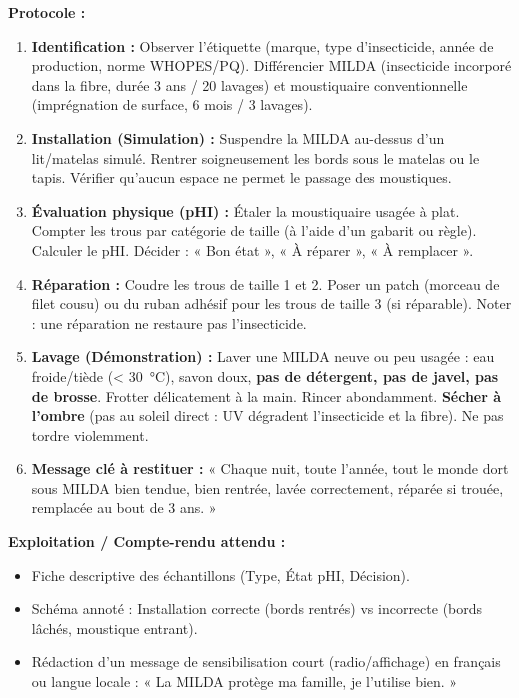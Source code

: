 \documentclass[11pt]{article}
\begin{document}
\begin{experience}
\textbf{Protocole :}
\begin{enumerate}
    \item \textbf{Identification :} Observer l'étiquette (marque, type d'insecticide, année de production, norme WHOPES/PQ). Différencier MILDA (insecticide incorporé dans la fibre, durée 3 ans / 20 lavages) et moustiquaire conventionnelle (imprégnation de surface, 6 mois / 3 lavages).
    \item \textbf{Installation (Simulation) :} Suspendre la MILDA au-dessus d'un lit/matelas simulé. Rentrer soigneusement les bords sous le matelas ou le tapis. Vérifier qu'aucun espace ne permet le passage des moustiques.
    \item \textbf{Évaluation physique (pHI) :} Étaler la moustiquaire usagée à plat. Compter les trous par catégorie de taille (à l'aide d'un gabarit ou règle). Calculer le pHI. Décider : « Bon état », « À réparer », « À remplacer ».
    \item \textbf{Réparation :} Coudre les trous de taille 1 et 2. Poser un patch (morceau de filet cousu) ou du ruban adhésif pour les trous de taille 3 (si réparable). Noter : une réparation ne restaure pas l'insecticide.
    \item \textbf{Lavage (Démonstration) :} Laver une MILDA neuve ou peu usagée : eau froide/tiède (< \SI{30}{\celsius}), savon doux, \textbf{pas de détergent, pas de javel, pas de brosse}. Frotter délicatement à la main. Rincer abondamment. \textbf{Sécher à l'ombre} (pas au soleil direct : UV dégradent l'insecticide et la fibre). Ne pas tordre violemment.
    \item \textbf{Message clé à restituer :} « Chaque nuit, toute l'année, tout le monde dort sous MILDA bien tendue, bien rentrée, lavée correctement, réparée si trouée, remplacée au bout de 3 ans. »
\end{enumerate}

\textbf{Exploitation / Compte-rendu attendu :}
\begin{itemize}
    \item Fiche descriptive des échantillons (Type, État pHI, Décision).
    \item Schéma annoté : Installation correcte (bords rentrés) vs incorrecte (bords lâchés, moustique entrant).
    \item Rédaction d'un message de sensibilisation court (radio/affichage) en français ou langue locale : « La MILDA protège ma famille, je l'utilise bien. »
\end{itemize}

\end{experience}
\end{document}
